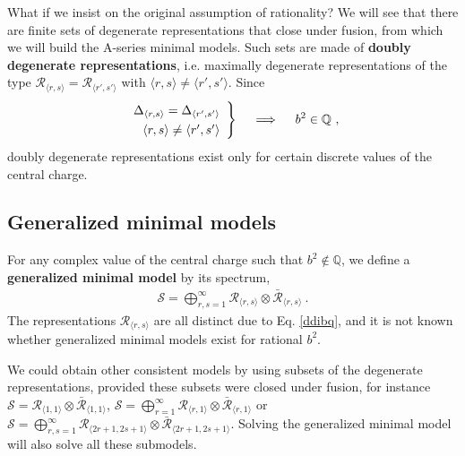 \documentclass[12pt, a4paper, notitlepage, twoside]{report}
\numberwithin{equation}{section}
\theoremstyle{break}
\begin{document}
What if we insist on the original assumption of rationality? We will see that there are finite sets 
of degenerate representations that close under fusion, from which we will build the A-series minimal models.
Such sets are made of
\textbf{\boldmath doubly degenerate representations}, i.e. maximally degenerate representations of the type $\mathcal{R}_{\langle r,s \rangle}=\mathcal{R}_{\langle r',s' \rangle}$ with $\langle r,s \rangle\neq \langle r',s' \rangle$. 
Since 
\begin{align}
\renewcommand{\arraystretch}{1.3}
 \left.\begin{array}{r} 
 \Delta_{\langle r,s \rangle}=\Delta_{\langle r',s' \rangle} \\ 
        \langle r,s \rangle\neq \langle r',s' \rangle
       \end{array} \right\} \quad \implies \quad b^2 \in\mathbb{Q}\ ,
 \label{ddibq}
\end{align}
doubly degenerate representations exist only for certain discrete values of the central charge. 

\subsection{Generalized minimal models \label{secgmm}}

For any complex value of the central charge such that $b^2\notin \mathbb{Q}$, we define a \textbf{\boldmath generalized minimal model} by its spectrum,
\begin{align}
 \boxed{\mathcal{S} = \bigoplus_{r,s=1}^\infty \mathcal{R}_{\langle r,s \rangle}\otimes \bar{\mathcal{R}}_{\langle r,s \rangle}}\ .
\end{align}
The representations $\mathcal{R}_{\langle r,s \rangle}$ are all distinct due to Eq. \eqref{ddibq}, and it is not known whether  generalized minimal models exist for rational $b^2$. 

We could obtain other consistent models by using subsets of the degenerate representations, provided these subsets were closed under fusion, for instance $\mathcal{S}=\mathcal{\mathcal{R}}_{\langle 1,1 \rangle}\otimes \bar{\mathcal{R}}_{\langle 1,1 \rangle}$, $\mathcal{S}=\bigoplus_{r=1}^\infty \mathcal{R}_{\langle r,1 \rangle}\otimes \bar{\mathcal{R}}_{\langle r,1 \rangle}$ or $\mathcal{S}=\bigoplus_{r,s=1}^{\infty} \mathcal{R}_{\langle 2r+1,2s+1 \rangle}\otimes \bar{\mathcal{R}}_{\langle 2r+1,2s+1 \rangle}$.
Solving the generalized minimal model will also solve all these submodels. 
\end{document}
